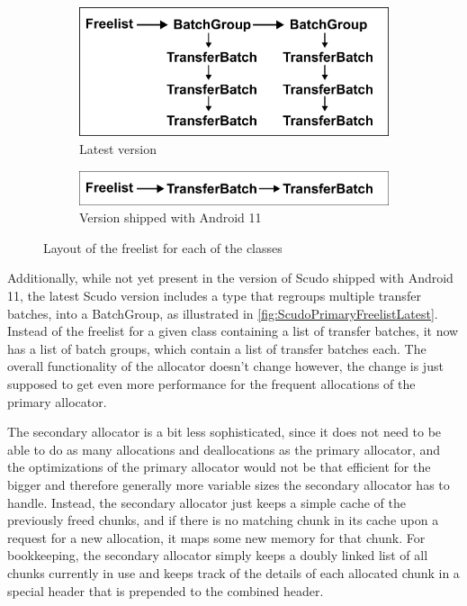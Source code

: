 \documentclass[a4paper,11pt,oneside]{report}
\begin{document}
\begin{figure}[h!]
  \centering
  \begin{subfigure}{.5\textwidth}
    \centering
    \includegraphics[width=.9\linewidth]{figures/ScudoPrimaryFreelistLatest.png}
    \caption{Latest version}
    \label{fig:ScudoPrimaryFreelistLatest}
  \end{subfigure}%
  \begin{subfigure}{.5\textwidth}
    \centering
    \includegraphics[width=.9\linewidth]{figures/ScudoPrimaryFreelistAndroid.png}
    \caption{Version shipped with Android 11}
    \label{fig:ScudoPrimaryFreelistAndroid}
  \end{subfigure}
  \caption{Layout of the freelist for each of the classes}
  \label{fig:ScudoPrimaryFreelist}
\end{figure}

Additionally, while not yet present in the version of Scudo shipped with Android
11, the latest Scudo version includes a type that regroups multiple transfer
batches, into a BatchGroup, as illustrated in \autoref{fig:ScudoPrimaryFreelistLatest}.
Instead of the freelist for a given class containing
a list of transfer batches, it now has a list of batch groups, which contain
a list of transfer batches each. The overall functionality of the allocator
doesn't change however, the change is just supposed to get even more performance
for the frequent allocations of the primary allocator.

The secondary allocator is a bit less sophisticated, since it does not need to
be able to do as many allocations and deallocations as the primary allocator,
and the optimizations of the primary allocator would not be that efficient for
the bigger and therefore generally more variable sizes the secondary allocator
has to handle. Instead, the secondary allocator just keeps a simple cache of
the previously freed chunks, and if there is no matching chunk in its cache
upon a request for a new allocation, it maps some new memory for that chunk.
For bookkeeping, the secondary allocator simply keeps a doubly linked list of
all chunks currently in use and keeps track of the details of each allocated
chunk in a special header that is prepended to the combined header.
\end{document}
